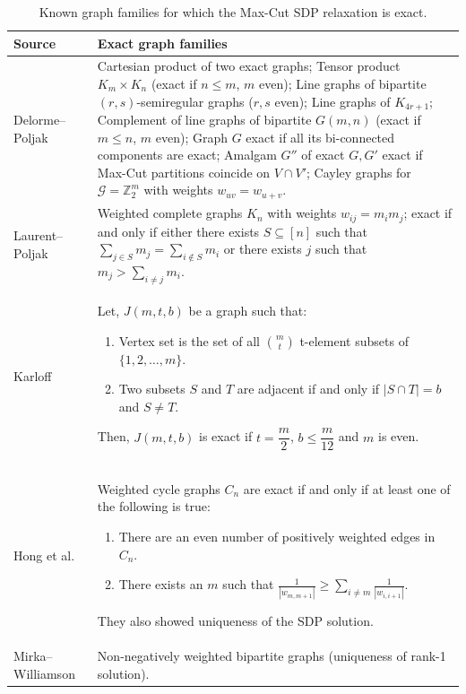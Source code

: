 \documentclass[a4paper,fleqn]{cas-sc}
\newcommand{\1}{\mathbf{1}}
\begin{document}
\begin{table}[h]
\centering
\caption{Known graph families for which the Max-Cut SDP relaxation is exact.\vspace*{0.5mm}}
\label{knowngraphs}
\begin{tabular}{p{4cm} p{9cm}}
\hline
\textbf{Source} & \textbf{Exact graph families} \\
\hline
Delorme--Poljak~\citep{delorme1993combinatorial,delorme1993alaplacian,delorme1993performance} 
& Cartesian product of two exact graphs; 
Tensor product $K_m \times K_n$ (exact if $n \leq m$, $m$ even); 
Line graphs of bipartite $(r,s)$-semiregular graphs ($r,s$ even); 
Line graphs of $K_{4r+1}$; 
Complement of line graphs of bipartite $G(m,n)$ (exact if $m \leq n$, $m$ even); 
Graph $G$ exact if all its bi-connected components are exact; 
Amalgam $G''$ of exact $G,G'$ exact if Max-Cut partitions coincide on $V \cap V'$; 
Cayley graphs for $\mathcal{G}=\mathbb{Z}_2^m$ with weights $w_{uv}=w_{u+v}$. \\[4pt]
\midrule
Laurent--Poljak~\citep{laurent1995positive} 
& Weighted complete graphs $K_n$ with weights $w_{ij}=m_i m_j$; exact if and only if either there exists $S \subseteq [n]$ such that $\sum_{j \in S} m_j =  \sum_{i \notin S} m_i$ or there exists $j$ such that $m_j > \sum_{i \neq j} m_i$. \\[4pt]
\midrule
Karloff~\citep{karloff1996good} 
&  Let, $J(m,t,b)$ be a graph such that: 
    \begin{enumerate}
        \item  Vertex set is the set of all $\binom{m}{t}$ t-element subsets of $\{1,2, \ldots, m\}$.
        \item  Two subsets $S$ and $T$ are adjacent if and only if $\left | S \cap T \right | = b$ and $S \neq T$.
    \end{enumerate}
    Then, $J(m,t,b)$ is exact if $t = \dfrac{m}{2}$, $b \leq \dfrac{m}{12}$ and $m$ is even.  \\[4mm]
\midrule
Hong et al.~\citep{hong}
& Weighted cycle graphs $C_n$ are exact if and only if at least one of the following is true:
        \begin{enumerate}
            \item There are an even number of positively weighted edges in $C_n$.
            \item There exists an $m$ such that $\frac{1}{\left|w_{m,m+1}\right|} \geq \sum\limits_{i \neq m} \frac{1}{\left|w_{i,i+1}\right|}$.
        \end{enumerate}
        They also showed uniqueness of the SDP solution. \\[4pt]
\midrule
Mirka--Williamson~\citep{mirka2024max} 
& Non-negatively weighted bipartite graphs (uniqueness of rank-1 solution).\\ 
\hline
\end{tabular}
\end{table}
\end{document}
